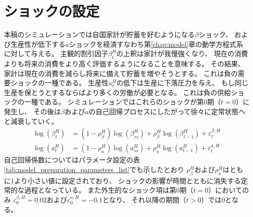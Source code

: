 
\section{ショックの設定}
\label{sec:model_preparation_shocks}

本稿のシミュレーションでは自国家計が貯蓄を好むようになる\(\beta\)ショック、
および生産性が低下する\(a\)ショックを経済すなわち第\ref{chap:model}章の動学方程式系に対して与える。
主観的割引因子\(\beta_t^H\)の上釈は家計が我慢強くなり、
現在の消費よりも将来の消費をより高く評価するようになることを意味する。
その結果、家計は現在の消費を減らし将来に備えて貯蓄を増やそうとする。
これは負の需要ショックの一種である。
生産性\(a_t^H\)の低下は生産に下落圧力を与え、
もし同じ生産を保とうとするならばより多くの労働が必要となる。
これは負の供給ショックの一種である。
シミュレーションではこれらのショックが第0期（\(t=0\)）に発生し、
その後は\(\beta\)および\(a\)の自己回帰プロセスにしたがって徐々に定常状態へと減衰していく。
\begin{equation}
\begin{aligned}
\log(\beta_t^H)&=(1-\rho_{\beta}^H)\log(\beta_{ss}^H)+\rho_{\beta}^H\log(\beta_{t-1}^H)+\varepsilon_t^{\beta,H} \\
\log(a_t^H)&=(1-\rho_{a}^H)\log(a_{ss}^H)+\rho_{a}^H\log(a_{t-1}^H)+\varepsilon_t^{a,H}
\end{aligned}
\label{eq:model_preparation_shocks_stochastic_processes}
\end{equation}
自己回帰係数についてはパラメータ設定の表\ref{tab:model_preparation_parameters_list}でも示したとおり
\(\rho_{\beta}^H\)および\(\rho_{a}^H\)はともに1より小さい値に設定されており、
ショックの影響が時間とともに消失する定常的な過程となっている。
また外生的なショック項は第0期（\(t=0\)）においてのみ
\(\varepsilon_0^{\beta,H}=0.02\)および\(\varepsilon_0^{a,H}=-0.1\)となり、
それ以降の期間（\(t>0\)）では0となる。